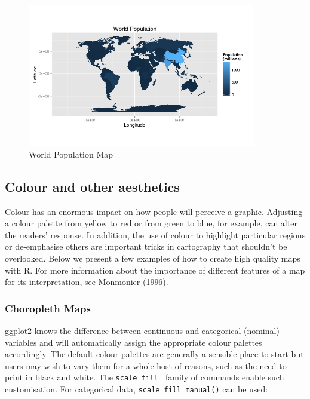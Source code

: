 \documentclass[]{article}
\let\Oldincludegraphics\includegraphics
\renewcommand{\includegraphics}[1]{\Oldincludegraphics[width=10cm]{#1}}
\begin{document}
\begin{figure}[htbp]
\centering
\includegraphics{figure/World_Population_Map.png}
\caption{World Population Map}
\end{figure}

\subsection{Colour and other aesthetics}

Colour has an enormous impact on how people will perceive a graphic.
Adjusting a colour palette from yellow to red or from green to blue, for
example, can alter the readers' response. In addition, the use of colour
to highlight particular regions or de-emphasise others are important
tricks in cartography that shouldn't be overlooked. Below we present a
few examples of how to create high quality maps with R. For more
information about the importance of different features of a map for its
interpretation, see Monmonier (1996).

\subsubsection{Choropleth Maps}

ggplot2 knows the difference between continuous and categorical
(nominal) variables and will automatically assign the appropriate colour
palettes accordingly. The default colour palettes are generally a
sensible place to start but users may wish to vary them for a whole host
of reasons, such as the need to print in black and white. The
\texttt{scale\_fill\_} family of commands enable such customisation. For
categorical data, \texttt{scale\_fill\_manual()} can be used:
\end{document}
